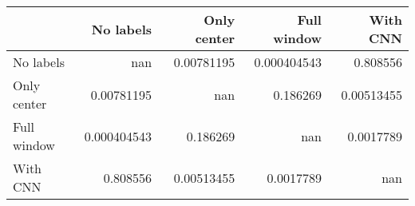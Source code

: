 \begin{tabular}{lrrrr}
\toprule
             &     No labels &   Only center &   Full window &     With CNN \\
\midrule
 No labels   & nan           &    0.00781195 &   0.000404543 &   0.808556   \\
 Only center &   0.00781195  &  nan          &   0.186269    &   0.00513455 \\
 Full window &   0.000404543 &    0.186269   & nan           &   0.0017789  \\
 With CNN    &   0.808556    &    0.00513455 &   0.0017789   & nan          \\
\bottomrule
\end{tabular}